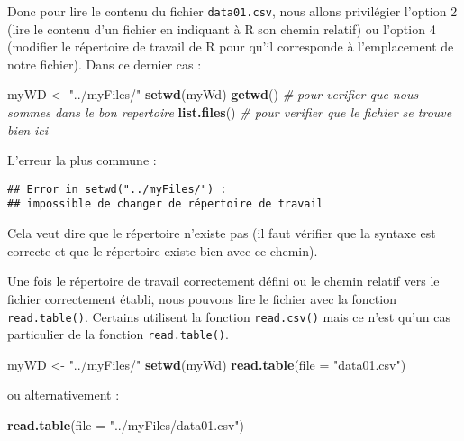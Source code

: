 \documentclass[]{book}
\newenvironment{Shaded}{\begin{snugshade}}{\end{snugshade}}
\newcommand{\KeywordTok}[1]{\textcolor[rgb]{0.13,0.29,0.53}{\textbf{#1}}}
\newcommand{\DataTypeTok}[1]{\textcolor[rgb]{0.13,0.29,0.53}{#1}}
\newcommand{\StringTok}[1]{\textcolor[rgb]{0.31,0.60,0.02}{#1}}
\newcommand{\CommentTok}[1]{\textcolor[rgb]{0.56,0.35,0.01}{\textit{#1}}}
\newcommand{\NormalTok}[1]{#1}
\theoremstyle{definition}
\theoremstyle{definition}
\theoremstyle{definition}
\theoremstyle{remark}
\begin{document}
Donc pour lire le contenu du fichier \texttt{data01.csv}, nous allons
privilégier l'option 2 (lire le contenu d'un fichier en indiquant à R
son chemin relatif) ou l'option 4 (modifier le répertoire de travail de
R pour qu'il corresponde à l'emplacement de notre fichier). Dans ce
dernier cas :

\begin{Shaded}
\begin{Highlighting}[]
\NormalTok{myWD <-}\StringTok{ "../myFiles/"}
\KeywordTok{setwd}\NormalTok{(myWd)}
\KeywordTok{getwd}\NormalTok{() }\CommentTok{# pour verifier que nous sommes dans le bon repertoire}
\KeywordTok{list.files}\NormalTok{() }\CommentTok{# pour verifier que le fichier se trouve bien ici}
\end{Highlighting}
\end{Shaded}

L'erreur la plus commune :

\begin{verbatim}
## Error in setwd("../myFiles/") : 
## impossible de changer de répertoire de travail
\end{verbatim}

Cela veut dire que le répertoire n'existe pas (il faut vérifier que la
syntaxe est correcte et que le répertoire existe bien avec ce chemin).

Une fois le répertoire de travail correctement défini ou le chemin
relatif vers le fichier correctement établi, nous pouvons lire le
fichier avec la fonction \texttt{read.table()}. Certains utilisent la
fonction \texttt{read.csv()} mais ce n'est qu'un cas particulier de la
fonction \texttt{read.table()}.

\begin{Shaded}
\begin{Highlighting}[]
\NormalTok{myWD <-}\StringTok{ "../myFiles/"}
\KeywordTok{setwd}\NormalTok{(myWd)}
\KeywordTok{read.table}\NormalTok{(}\DataTypeTok{file =} \StringTok{"data01.csv"}\NormalTok{)}
\end{Highlighting}
\end{Shaded}

ou alternativement :

\begin{Shaded}
\begin{Highlighting}[]
\KeywordTok{read.table}\NormalTok{(}\DataTypeTok{file =} \StringTok{"../myFiles/data01.csv"}\NormalTok{)}
\end{Highlighting}
\end{Shaded}
\end{document}

